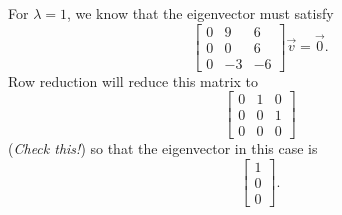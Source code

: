 \documentclass{ximera}
\begin{document}
\begin{exampleSol}
    For $\lambda = 1$, we know that the eigenvector must satisfy
    \[ 
        \begin{bmatrix} 
            0 & 9 & 6 \\ 
            0 & 0 & 6 \\ 
            0 & -3 & -6 
        \end{bmatrix} 
        \vec{v} = \vec{0}. 
    \] 
    Row reduction will reduce this matrix to
    \[ 
        \begin{bmatrix} 
            0 & 1 & 0 \\ 
            0 & 0 & 1 \\ 
            0 & 0 & 0 
        \end{bmatrix} 
    \] 
    (\emph{Check this!}) so that the eigenvector in this case is 
    \[ 
        \begin{bmatrix} 
            1 
            \\ 
            0 
            \\ 
            0 
        \end{bmatrix}.
    \]
    

\end{exampleSol}
\end{document}
